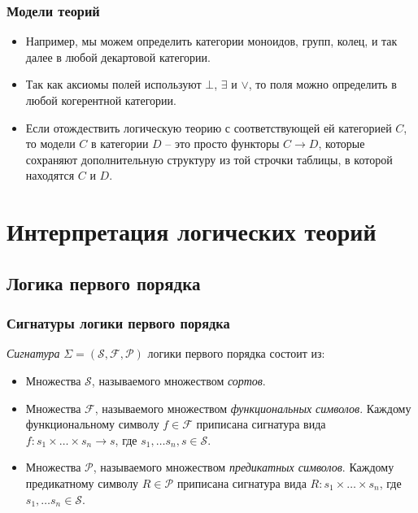 \documentclass{beamer}
\theoremstyle{definition}
\begin{document}
\begin{frame}
\frametitle{Модели теорий}
\begin{itemize}
\item Например, мы можем определить категории моноидов, групп, колец, и так далее в любой декартовой категории.
\item Так как аксиомы полей используют $\bot$, $\exists$ и $\lor$, то поля можно определить в любой когерентной категории.
\item Если отождествить логическую теорию с соответствующей ей категорией $C$, то модели $C$ в категории $D$ -- это просто функторы $C \to D$, которые сохраняют дополнительную структуру из той строчки таблицы, в которой находятся $C$ и $D$.
\end{itemize}
\end{frame}

\section{Интерпретация логических теорий}

\subsection{Логика первого порядка}

\begin{frame}
\frametitle{Сигнатуры логики первого порядка}
\emph{Сигнатура} $\Sigma = (\mathcal{S}, \mathcal{F}, \mathcal{P})$ логики первого порядка состоит из:
\begin{itemize}
\item Множества $\mathcal{S}$, называемого множеством \emph{сортов}.
\item Множества $\mathcal{F}$, называемого множеством \emph{функциональных символов}.
Каждому функциональному символу $f \in \mathcal{F}$ приписана сигнатура вида $f : s_1 \times \ldots \times s_n \to s$, где $s_1, \ldots s_n, s \in \mathcal{S}$.
\item Множества $\mathcal{P}$, называемого множеством \emph{предикатных символов}.
Каждому предикатному символу $R \in \mathcal{P}$ приписана сигнатура вида $R : s_1 \times \ldots \times s_n$, где $s_1, \ldots s_n \in \mathcal{S}$.
\end{itemize}
\end{frame}
\end{document}
